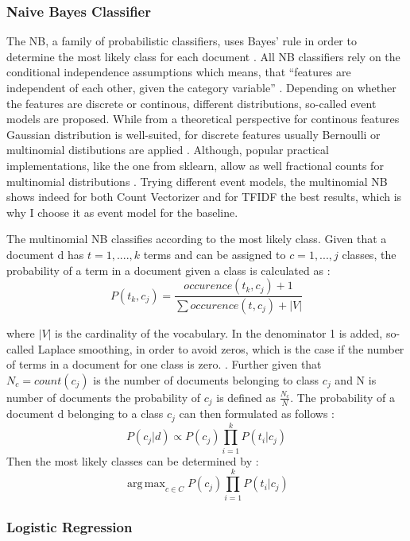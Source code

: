 \documentclass[12pt, a4paper, titlepage]{article}
\DeclareMathOperator*{\argmax}{arg\,max}
\begin{document}
\subsubsection{Naive Bayes Classifier}
The \ac{NB}, a family of probabilistic classifiers, uses Bayes' rule in order to determine the most likely class for each document \citep{Schneider2005}. All \ac{NB} classifiers rely on the conditional independence assumptions which means, that ``features are independent of each other, given the category variable'' \citep[48]{Xu2018}. Depending on whether the features are discrete or continous, different distributions, so-called event models are proposed. While from a theoretical perspective for continous features Gaussian distribution is well-suited, for discrete features usually Bernoulli or multinomial distibutions are applied \citep{Xu2018}. Although, popular practical implementations, like the one from sklearn, allow as well fractional counts for multinomial distributions \citep{scikit-learn}. Trying different event models, the multinomial \ac{NB} shows indeed for both Count Vectorizer and for TFIDF the best results, which is why I choose it as event model for the baseline. 

The multinomial \ac{NB} classifies according to the most likely class. Given that a document d has $t = 1, ...., k$ terms and can be assigned to $c = 1,...,j$ classes, the probability of a term in a document given a class is calculated as \citep{Manning2008}:
\[ P(t_k, c_j) = \frac{occurence(t_k, c_j) + 1}{\sum occurence(t, c_j) + |V|} \]

where $|V|$ is the cardinality of the vocabulary. In the denominator 1 is added, so-called Laplace smoothing, in order to avoid zeros, which is the case if the number of terms in a document for one class is zero. \citep{Manning2008}. Further given that $N_c = count(c_j)$ is the number of documents belonging to class $c_j$ and N is number of documents the probability of $c_j$ is defined as $\frac{N_c}{N}$. The probability of a document d belonging to a class $c_j$ can then formulated as follows \citep[258]{Manning2008}:
\[ P(c_j|d) \propto P(c_j) \prod_{i = 1}^k P(t_i|c_j) \]
Then the most likely classes can be determined by \citep{Manning2008}: 
\[\argmax_{c \in C} P(c_j) \prod_{i = 1}^k P(t_i|c_j) \] 

\subsubsection{Logistic Regression}
\end{document}
